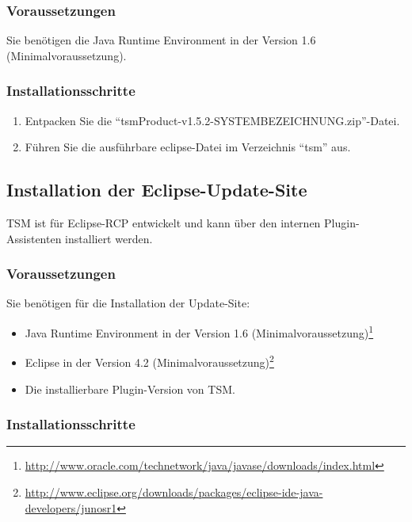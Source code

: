 \documentclass[11pt,a4paper,titlepage]{article}
\begin{document}
\subsubsection{Voraussetzungen}
Sie benötigen die Java Runtime Environment in der Version 1.6 (Minimalvoraussetzung).

\subsubsection{Installationsschritte}
\begin{enumerate}
 \item Entpacken Sie die "`tsmProduct-v1.5.2-SYSTEMBEZEICHNUNG.zip"'-Datei.
 \item Führen Sie die ausführbare eclipse-Datei im Verzeichnis "`tsm"' aus.
\end{enumerate}


\subsection{Installation der Eclipse-Update-Site}
TSM ist für Eclipse-RCP entwickelt und kann über den internen Plugin-Assistenten installiert werden.


\subsubsection{Voraussetzungen}
Sie benötigen für die Installation der Update-Site:
\begin{itemize}
 \item Java Runtime Environment in der Version 1.6 (Minimalvoraussetzung)\footnote{\href{http://www.oracle.com/technetwork/java/javase/downloads/index.html}
 {http://www.oracle.com/technetwork/java/javase/downloads/index.html}}
 \item Eclipse in der Version 4.2 (Minimalvoraussetzung)\footnote{\href{http://www.eclipse.org/downloads/packages/eclipse-ide-java-developers/junosr1}
 {http://www.eclipse.org/downloads/packages/eclipse-ide-java-developers/junosr1}}
 \item Die installierbare Plugin-Version von TSM.
\end{itemize}

\subsubsection{Installationsschritte}
\end{document}
